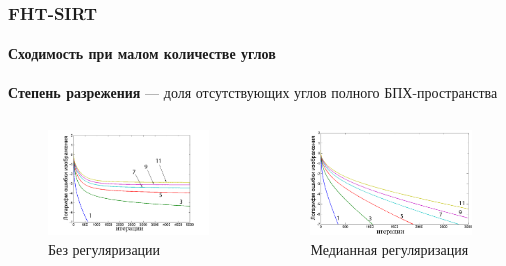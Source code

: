 \documentclass[12pt]{beamer}
\begin{document}
\begin{frame}
\frametitle{FHT-SIRT}
\framesubtitle{Сходимость при малом количестве углов}
\textbf{Степень разрежения} --- доля отсутствующих углов полного БПХ-пространства
\begin{columns}[T,onlytextwidth]
  \hspace*{-1cm}
  \begin{column}{0.6\textwidth}
  \begin{figure}
    \includegraphics[width=\textwidth]{../Dissertation/images/part1_img/raw}
    \caption{Без регуляризации}
  \end{figure}
  
  \end{column}
  \begin{column}{0.55\textwidth}
    \begin{figure}
    \includegraphics[width=\textwidth]{../Dissertation/images/part1_img/medk}
    \caption{Медианная регуляризация}
    \end{figure}
  \end{column}
\end{columns}
\end{frame}
\end{document}
